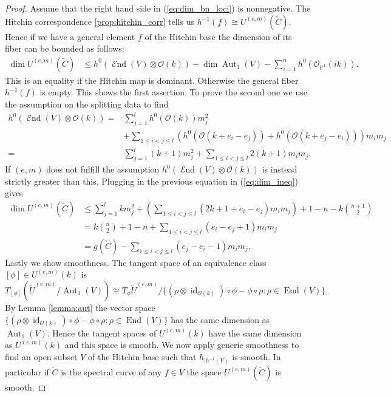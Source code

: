 \documentclass[12pt]{extarticle}
\theoremstyle{definition}
\numberwithin{theorem}{section}
\newcommand{\PP}{\mathbb{P}}
\newcommand{\OO}{\mathcal{O}}
\newcommand{\op}{\operatorname}
\DeclareMathOperator{\End}{\mathcal{E}nd}
\renewcommand{\tilde}{\widetilde}		%
\begin{document}
\begin{proof} Assume that the right hand side in (\ref{eq:dim_bn_loci}) is nonnegative.
The Hitchin correspondence \ref{prop:hitchin_corr} tells us $h^{-1}(f) \cong U^{(e,m)}(\tilde{C})$.
Hence if we have a general element $f$ of the Hitchin base the dimension of its fiber can be bounded as follows:
\begin{align}\label{eq:dim_ineq}
\dim U^{(e,m)}(\tilde{C}) &\leq h^0(\End(V) \otimes \OO(k) ) - \dim \op{Aut}_1(V) - \sum_{i=1}^{n}h^0(\OO_{\PP^1}(ik)).
\end{align}
This is an equality if the Hitchin map is dominant. Otherwise the general fiber $h^{-1}(f)$ is empty. This shows the first assertion.
To prove the second one we use the assumption on the splitting data to find 
\begin{align*}
h^0(\End(V) \otimes \OO(k)) =& \sum_{j=1}^lh^0(\OO(k))m_j^2 \\&+ \sum_{1\leq i < j \leq l}\left( h^0(\OO(k + e_i - e_j)) + h^0(\OO(k+e_j - e_i))\right)m_im_j\\
=&  \sum_{j=1}^l (k+1)m_j^2+  \sum_{1 \leq i < j \leq l}2(k+1)m_im_j.
\end{align*}
If $(e,m)$ does not fulfill the assumption $h^0(\End(V) \otimes \OO(k))$ is instead strictly greater than this. 
Plugging in the previous equation in (\ref{eq:dim_ineq}) gives
\begin{align*}
\dim U^{(e,m)}(\tilde{C}) &\leq  \sum_{j=1}^l km_j^2+  \left(\sum_{1 \leq i < j \leq l}(2k+1 + e_i - e_j)m_im_j \right) + 1 - n- k\binom{n+1}{2} \\
&= 
k\binom{n}{2} + 1 - n + \sum_{1\leq i < j\leq l}(e_i - e_j +1)m_im_j \\
&= g(\tilde{C}) - \sum_{1 \leq i < j\leq l}(e_j - e_i -1 )m_im_j.
\end{align*} 
Lastly we show smoothness. The tangent space of an equivalence class $[\phi] \in U^{(e,m)}(k)$ is 
\begin{equation*}
T_{[\phi]}\left(\tilde{U}^{(e,m)}/\op{Aut}_1(V)\right) 
\cong T_\phi \tilde{U}^{(e,m)}/ \{ (\rho\otimes \op{id}_{\OO(k)})\circ\phi - \phi\circ\rho : \rho \in \op{End}(V)\}. 
\end{equation*}
By Lemma \ref{lemma:aut} the vector space $\{ (\rho\otimes \op{id}_{\OO(k)})\circ\phi - \phi\circ\rho : \rho \in \op{End}(V)\}$ has the same dimension as $\op{Aut}_1(V)$. Hence the tangent spaces of $U^{(e,m)}(k)$ have the same dimension as $U^{(e,m)}(k)$ and this space is smooth. We now apply generic smoothness \cite[Theorem 21.6.6]{Vakil} to find an open subset $V$ of the Hitchin base such that $h_{|h^{-1}(V)}$ is smooth. In particular if $\tilde{C}$ is the spectral curve of any $f \in V$ the space $U^{(e,m)}(\tilde{C})$ is smooth.
\end{proof}
\end{document}
